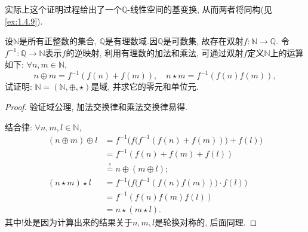 \begin{remark}
    实际上这个证明过程给出了一个$\mathbb{Q}$-线性空间的基变换, 从而两者将同构(见\ref{ex:1.4.9}).
\end{remark}

\begin{problem}\label{ex:1.1.4}
    设$\mathbb{N}$是所有正整数的集合, $\mathbb{Q}$是有理数域.因$\mathbb{Q}$是可数集, 故存在双射$f:\mathbb{N} \to \mathbb{Q}$. 令$f^{-1}:\mathbb{Q} \to \mathbb{N}$表示$f$的逆映射, 利用有理数的加法和乘法, 可通过双射$f$定义$\mathbb{N}$上的运算如下: $\forall n, m \in \mathbb{N}$,
    \[
        n \oplus m = f^{-1}(f(n) + f(m)), \quad n \star m = f^{-1}(f(n)f(m)),
    \]
    试证明: $\mathbb{N} = (\mathbb{N}, \oplus, \star)$是域, 并求它的零元和单位元.
\end{problem}

\begin{proof}
    验证域公理, 加法交换律和乘法交换律易得.

    结合律: $\forall n, m, l \in \mathbb{N}$,
    \[
    \begin{aligned}
        (n \oplus m) \oplus l &= f^{-1}\biggl(f\bigl(f^{-1}(f(n) + f(m))\bigr)+ f(l)\biggr)\\
        &= f^{-1}(f(n) + f(m) + f(l))\\
        &\overset{!}= n \oplus (m \oplus l);\\
        (n \star m) \star l &= f^{-1}\biggl(f\bigl(f^{-1}(f(n)f(m))\bigr) \cdot f(l)\biggr)\\
        &= f^{-1}(f(n)f(m)f(l))\\
        &= n \star (m \star l).
    \end{aligned}
    \]
    其中!处是因为计算出来的结果关于$n, m, l$是轮换对称的, 后面同理.


\end{proof}
